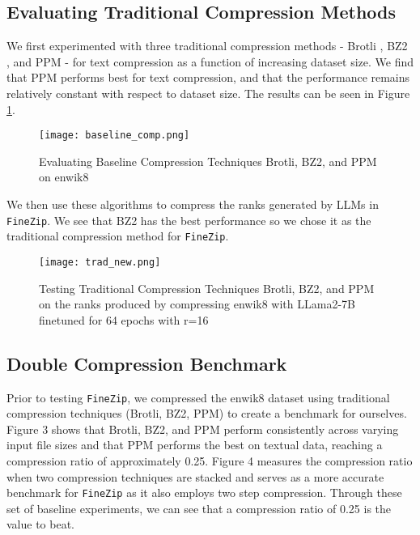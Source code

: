 \documentclass[11pt]{article}
\begin{document}
\subsection{Evaluating Traditional Compression Methods}\label{sec:traditional}
We first experimented with three traditional compression methods - Brotli \citep{brotli}, BZ2 \citep{bzip2}, and PPM \citep{1096090} - for text compression as a function of increasing dataset size. We find that PPM performs best for text compression, and that the performance remains relatively constant with respect to dataset size. The results can be seen in Figure \ref{fig:traditional-text}.

\begin{figure}[H]
    \centering
    \texttt{[image: baseline\_comp.png]} %
    \centering
    \caption{Evaluating Baseline Compression Techniques Brotli, BZ2, and PPM on enwik8}
    \centering
    \label{fig:traditional-text}
    \centering
\end{figure}

We then use these algorithms to compress the ranks generated by LLMs in \texttt{FineZip}. We see that BZ2 has the best performance so we chose it as the traditional compression method for \texttt{FineZip}.

\begin{figure}[H]
    \centering
    \texttt{[image: trad\_new.png]} %
    \centering
    \caption{Testing Traditional Compression Techniques Brotli, BZ2, and PPM on the ranks produced by compressing enwik8 with LLama2-7B finetuned for 64 epochs with r=16}
    \centering
    \label{fig:traditional-ranks}
    \centering
\end{figure}


\subsection{Double Compression Benchmark}

Prior to testing \texttt{FineZip}, we compressed the enwik8 \cite{enwik8} dataset using traditional compression techniques (Brotli, BZ2, PPM) to create a benchmark for ourselves. Figure 3 shows that Brotli, BZ2, and PPM perform consistently across varying input file sizes and that PPM performs the best on textual data, reaching a compression ratio of approximately 0.25. Figure 4 measures the compression ratio when two compression techniques are stacked and serves as a more accurate benchmark for \texttt{FineZip} as it also employs two step compression. Through these set of baseline experiments, we can see that a compression ratio of 0.25 is the value to beat. 
\end{document}
